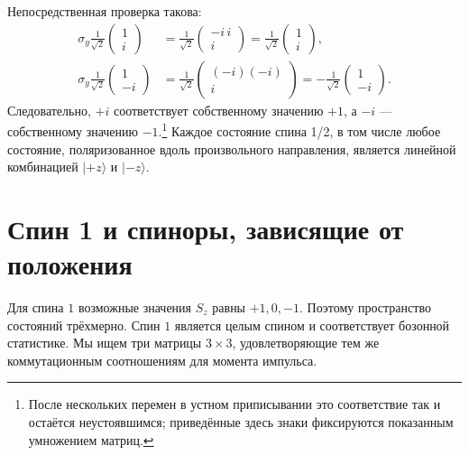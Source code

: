 \begin{classroomqa}
\end{classroomqa}

Непосредственная проверка такова:
\begin{align}
\sigma_y\frac{1}{\sqrt2}
\begin{pmatrix}
1\\
i
\end{pmatrix}
&=
\frac{1}{\sqrt2}
\begin{pmatrix}
-i\,i\\
i
\end{pmatrix}
=
\frac{1}{\sqrt2}
\begin{pmatrix}
1\\
i
\end{pmatrix},\\
\sigma_y\frac{1}{\sqrt2}
\begin{pmatrix}
1\\
-i
\end{pmatrix}
&=
\frac{1}{\sqrt2}
\begin{pmatrix}
(-i)(-i)\\
i
\end{pmatrix}
=
-\frac{1}{\sqrt2}
\begin{pmatrix}
1\\
-i
\end{pmatrix}.
\end{align}
Следовательно, \(+i\) соответствует собственному значению \(+1\), а \(-i\) — собственному значению \(-1\).\footnote{После нескольких перемен в устном приписывании это соответствие так и остаётся неустоявшимся; приведённые здесь знаки фиксируются показанным умножением матриц.} Каждое состояние спина 1/2, в том числе любое состояние, поляризованное вдоль произвольного направления, является линейной комбинацией \(|+z\rangle\) и \(|-z\rangle\).

\section{Спин 1 и спиноры, зависящие от положения}

Для спина \(1\) возможные значения \(S_z\) равны \(+1,0,-1\). Поэтому пространство состояний трёхмерно. Спин \(1\) является целым спином и соответствует бозонной статистике. Мы ищем три матрицы \(3\times3\), удовлетворяющие тем же коммутационным соотношениям для момента импульса.

